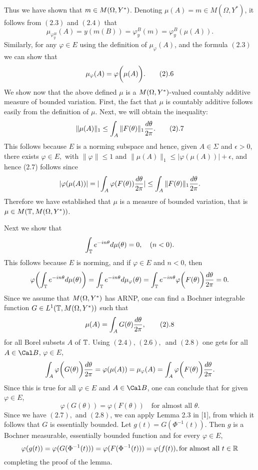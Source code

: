 Thus we have shown that $m\in M(\Omega, Y^*)$.
 Denoting $\mu (A)= m\in M(\Omega,Y^*)$, it follows from $(2.3)$
and $(2.4)$
that
$$\mu_{\varphi_y^B}(A)=y(m(B)) =\varphi_y^B (m) = \varphi_y^B(\mu(A)).$$
   Similarly,  for any $\varphi \in E$
using the definition of $\mu_\varphi (A)$, and the formula $(2.3)$
we can show that
$$\mu_{\varphi}(A) = \varphi\biggl( \mu(A)\biggr).\tag2.6$$
  We show  now that the above defined $\mu$ is a $M(\Omega, Y^*)$-valued  countably
additive measure  of bounded variation. First,  the fact that
$\mu $ is countably additive  follows  easily from the
definition  of $\mu$.
Next, we will obtain
the inequality:
$$\| \mu (A)\|_1 \le \int_A \|  F(\theta)
\|_1{{d\theta}\over{2\pi}}. \tag2.7$$
This follows because $E$ is a norming subspace and hence, given
$A\in \Sigma$ and $\epsilon >0$, there exists $\varphi \in E,$ with
$\|\varphi\|
\le 1$ and $\|\mu(A)\|_1 \le |\varphi (\mu(A))|+\epsilon$, and
hence (2.7) follows since
$$|\varphi(\mu(A))|= |\int_A \varphi(F(\theta)){{d\theta}\over{2\pi}}|
\le \int_A\| F(\theta)\|_1 {{d\theta}\over{2\pi}}.$$
Therefore we have established that $\mu$ is a
measure  of bounded variation, that is $\mu \in M(\Bbb T, M(\Omega, Y^*))$.

Next we show that
$$\int_{\Bbb T} e^{-i n \theta} d\mu(\theta) =0, \quad (n<0).$$
This follows because $E$ is norming, and if $\varphi\in E$ and
$n<0$, then
$$\varphi \biggl( \int_{\Bbb T} e^{-i n \theta} d\mu(\theta)\biggr) =
\int_{\Bbb T} e^{-i n \theta} d\mu_{\varphi} (\theta) = \int_{\Bbb T} e^{-i
n \theta} \varphi\biggl( F(\theta)\biggr) {{d\theta}\over {2\pi}}
=0.$$
Since we assume that $M(\Omega, Y^*)$ has ARNP, one can find a Bochner integrable
function      $G\in L^1(\Bbb T,M(\Omega, Y^*))$     such that
$$\mu(A) = \int_A G(\theta)  {{d\theta}\over {2\pi}},\tag2.8$$
for all Borel subsets $A$ of $\Bbb T$.  Using $(2.4),\,(2.6),\,$ and
$(2.8)$ one gets for all $A\in \Cal B$, $\varphi \in E$,
$$ \int_A \varphi \biggl( G(\theta)\biggr) {{d\theta}\over
{2\pi}}= \varphi(\mu(A)) = \mu_{\varphi}(A) = \int_A \varphi
\biggl( F(\theta)\biggr) {{d\theta}\over {2\pi}}.$$
Since this is true for all $\varphi \in E$ and $A\in \Cal B$, one can
conclude that for given  $\varphi \in E$,
$$ \varphi (G(\theta)) = \varphi (F(\theta))
   \quad\text{for almost all $\theta$.} $$
Since we have $(2.7),$ and $(2.8)$, we can apply Lemma 2.3 in [1], from
which it follows that $G$ is essentially
bounded.  Let $g(t)=G(\Phi^{-1} (t))$. Then $g$ is a Bochner
measurable, essentially bounded function and for every $\varphi
\in E$, $$\varphi(g(t))= \varphi(G(\Phi^{-1} (t)))=\varphi(F(\Phi^{-1}
(t)))=\varphi(f(t)),\text{for almost all } t\in \Bbb R
  $$
completing the proof of the lemma.\endprf

